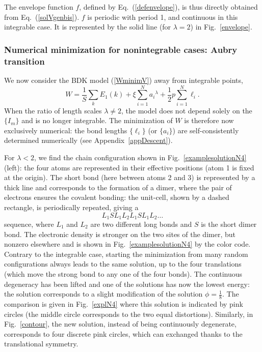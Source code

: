\documentclass[]{revtex4-1}
\begin{document}
The envelope function $f$, defined by Eq.~(\ref{defenvelope}), is thus directly obtained from Eq.~(\ref{solVgenbis}). $f$ is periodic with period 1, and continuous in this integrable case. It is represented by the solid line (for $\lambda=2$) in Fig.~\ref{envelope}.

\subsubsection{Numerical minimization for nonintegrable cases: Aubry transition}
\label{numN4ni}

We now consider the BDK model (\ref{WminimV}) away from integrable points, 
\begin{equation}
W= \frac{1}{S}   \sum_{k} E_{1}(k)  +  \xi \sum_{i=1}^{N}  {a_i}^{\lambda}  + \frac{1}{2} p \sum_{i=1}^{N} \ell_i.
\label{WminimV2} \end{equation}
When the ratio of length scales $\lambda \neq 2$, the model does not depend solely on the $\{I_m\}$ and is no longer integrable. The minimization of $W$ is therefore now exclusively numerical: the bond lengths $\{\ell_i\}$ (or $\{ a_i\}$) are self-consistently determined numerically (see Appendix~\ref{appDescent}).

For $\lambda<2$, we find the chain configuration shown in Fig.~\ref{examplesolutionN4} (left): the four atoms are represented in their effective positions (atom 1 is fixed at the origin).
The short bond (here between atoms 2 and 3) is represented by a thick line and corresponds to the formation of a dimer, where the pair of electrons ensures the covalent bonding: the unit-cell, shown by a dashed rectangle, is periodically repeated, giving a \begin{equation} L_1SL_1L_2L_1SL_1L_2\dots \end{equation} sequence, where $L_1$ and $L_2$ are two different long bonds and $S$ is the short dimer bond. The electronic density is stronger on the two sites of the dimer, but nonzero elsewhere and is
shown in Fig.~\ref{examplesolutionN4} by the color code.
Contrary to the integrable case, starting the minimization from many random configurations always leads to the same solution, up to the four translations (which move the strong bond to any one of the four bonds). The continuous degeneracy has been lifted and one of the solutions has now the lowest energy: the solution corresponds to a slight modification of the  solution $\phi=\frac{1}{8}$. The comparison is given in Fig.~\ref{explN4} where this solution is indicated by pink circles (the middle circle corresponds to the two equal distortions). Similarly, in Fig.~\ref{contour}, the new solution, instead of being continuously degenerate, corresponds to four discrete pink circles, which can exchanged thanks to the translational symmetry.
\end{document}
